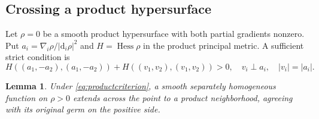\documentclass[11pt]{article}
\newtheorem{lemma}[theorem]{Lemma}
\theoremstyle{definition}\newtheorem{definition}[theorem]{Definition}
\theoremstyle{remark}\newtheorem{remark}[theorem]{Remark}
\newcommand{\dd}{\mathrm d}
\newcommand{\Hess}{\operatorname{Hess}}
\begin{document}
\subsection{Crossing a product hypersurface}
Let $\rho=0$ be a smooth product hypersurface with both partial gradients
nonzero. Put $a_i=\nabla_i\rho/|\dd_i\rho|^2$ and $H=\Hess\rho$ in the
product principal metric. A sufficient strict condition is
\begin{equation}\label{eq:productcriterion}
 H((a_1,-a_2),(a_1,-a_2))+H((v_1,v_2),(v_1,v_2))>0,
 \quad v_i\perp a_i,\quad |v_i|=|a_i|.
\end{equation}
\begin{lemma}\label{lem:surface}
Under \eqref{eq:productcriterion}, a smooth separately homogeneous function
on $\rho>0$ extends across the point to a product neighborhood, agreeing
with its original germ on the positive side.
\end{lemma}
\end{document}
